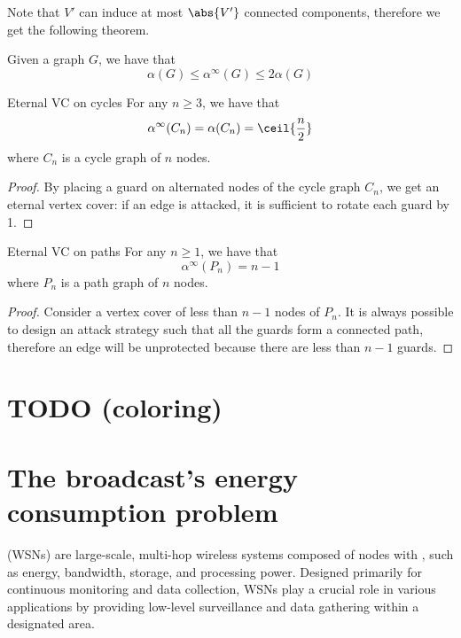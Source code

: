 \documentclass[a4paper, 12pt]{report}
\begin{document}
    Note that $V'$ can induce at most $\abs{V'}$ connected components, therefore we get the following theorem.

    \begin{framedthm}{}
        Given a graph $G$, we have that $$\alpha(G) \le \alpha^{\infty} (G) \le 2 \alpha(G)$$
    \end{framedthm}

    \begin{framedthm}{Eternal VC on cycles}
        For any $n \ge 3$, we have that $$\alpha^{\infty}(C_n) = \alpha(C_n) = \ceil{\frac{n}{2}}$$ where $C_n$ is a cycle graph of $n$ nodes.
    \end{framedthm}

    \begin{proof}
        By placing a guard on alternated nodes of the cycle graph $C_n$, we get an eternal vertex cover: if an edge is attacked, it is sufficient to rotate each guard by 1.
    \end{proof}

    \begin{framedthm}{Eternal VC on paths}
        For any $n \ge 1$, we have that $$\alpha^{\infty}(P_n) = n - 1$$ where $P_n$ is a path graph of $n$ nodes.
    \end{framedthm}
    
    \begin{proof}
        Consider a vertex cover of less than $n - 1$ nodes of $P_n$. It is always possible to design an attack strategy such that all the guards form a connected path, therefore an edge will be unprotected because there are less than $n - 1$ guards.
    \end{proof}

    \chapter{TODO (coloring)}

    \chapter{The broadcast's energy consumption problem}

     (WSNs) are large-scale, multi-hop wireless systems composed of nodes with , such as energy, bandwidth, storage, and processing power. Designed primarily for continuous monitoring and data collection, WSNs play a crucial role in various applications by providing low-level surveillance and data gathering within a designated area.
\end{document}

